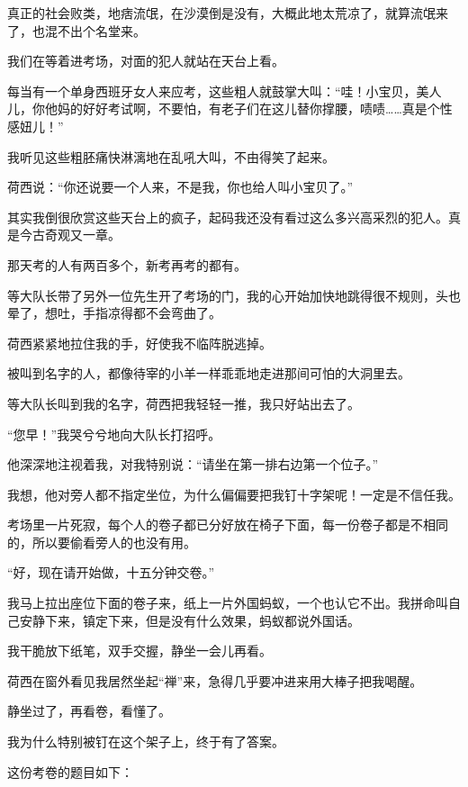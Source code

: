 \par 真正的社会败类，地痞流氓，在沙漠倒是没有，大概此地太荒凉了，就算流氓来了，也混不出个名堂来。
\par 我们在等着进考场，对面的犯人就站在天台上看。
\par 每当有一个单身西班牙女人来应考，这些粗人就鼓掌大叫：“哇！小宝贝，美人儿，你他妈的好好考试啊，不要怕，有老子们在这儿替你撑腰，啧啧……真是个性感妞儿！”
\par 我听见这些粗胚痛快淋漓地在乱吼大叫，不由得笑了起来。
\par 荷西说：“你还说要一个人来，不是我，你也给人叫小宝贝了。”
\par 其实我倒很欣赏这些天台上的疯子，起码我还没有看过这么多兴高采烈的犯人。真是今古奇观又一章。
\par 那天考的人有两百多个，新考再考的都有。
\par 等大队长带了另外一位先生开了考场的门，我的心开始加快地跳得很不规则，头也晕了，想吐，手指凉得都不会弯曲了。
\par 荷西紧紧地拉住我的手，好使我不临阵脱逃掉。
\par 被叫到名字的人，都像待宰的小羊一样乖乖地走进那间可怕的大洞里去。
\par 等大队长叫到我的名字，荷西把我轻轻一推，我只好站出去了。
\par “您早！”我哭兮兮地向大队长打招呼。
\par 他深深地注视着我，对我特别说：“请坐在第一排右边第一个位子。”
\par 我想，他对旁人都不指定坐位，为什么偏偏要把我钉十字架呢！一定是不信任我。
\par 考场里一片死寂，每个人的卷子都已分好放在椅子下面，每一份卷子都是不相同的，所以要偷看旁人的也没有用。
\par “好，现在请开始做，十五分钟交卷。”
\par 我马上拉出座位下面的卷子来，纸上一片外国蚂蚁，一个也认它不出。我拼命叫自己安静下来，镇定下来，但是没有什么效果，蚂蚁都说外国话。
\par 我干脆放下纸笔，双手交握，静坐一会儿再看。
\par 荷西在窗外看见我居然坐起“禅”来，急得几乎要冲进来用大棒子把我喝醒。
\par 静坐过了，再看卷，看懂了。
\par 我为什么特别被钉在这个架子上，终于有了答案。
\par 这份考卷的题目如下：
